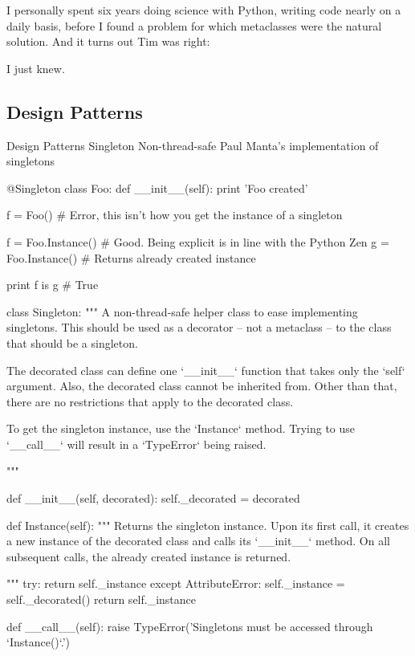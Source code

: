 I personally spent six years doing science with Python, writing code nearly on a daily basis, before I found a problem for which metaclasses were the natural solution. And it turns out Tim was right:

I just knew.

\subsection{Design Patterns}

Design Patterns
Singleton
Non-thread-safe
Paul Manta's implementation of singletons

@Singleton
class Foo:
   def __init__(self):
       print 'Foo created'

f = Foo() # Error, this isn't how you get the instance of a singleton

f = Foo.Instance() # Good. Being explicit is in line with the Python Zen
g = Foo.Instance() # Returns already created instance

print f is g # True

class Singleton:
    """
    A non-thread-safe helper class to ease implementing singletons.
    This should be used as a decorator -- not a metaclass -- to the
    class that should be a singleton.

    The decorated class can define one `__init__` function that
    takes only the `self` argument. Also, the decorated class cannot be
    inherited from. Other than that, there are no restrictions that apply
    to the decorated class.

    To get the singleton instance, use the `Instance` method. Trying
    to use `__call__` will result in a `TypeError` being raised.

    """

    def __init__(self, decorated):
        self._decorated = decorated

    def Instance(self):
        """
        Returns the singleton instance. Upon its first call, it creates a
        new instance of the decorated class and calls its `__init__` method.
        On all subsequent calls, the already created instance is returned.

        """
        try:
            return self._instance
        except AttributeError:
            self._instance = self._decorated()
            return self._instance

    def __call__(self):
        raise TypeError('Singletons must be accessed through `Instance()`.')

